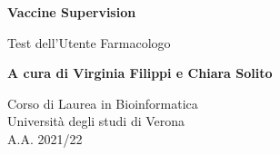 \documentclass{article}
\begin{document}
\newcommand\tab[1][0.3cm]{\hspace*{#1}}


\begin{titlepage}
    \begin{center}
        \vspace*{1cm}
            
        \Huge
        \textbf{Vaccine Supervision}
            
        \vspace{0.5cm}
        \LARGE
        Test dell'Utente Farmacologo
            
        \vspace{1.5cm}
            
        \textbf{A cura di Virginia Filippi e Chiara Solito}

        \vspace{0.8cm}

            
        \Large
        Corso di Laurea in Bioinformatica\\
        Università degli studi di Verona\\
        A.A. 2021/22
            
    \end{center}
\end{titlepage}
\end{document}
